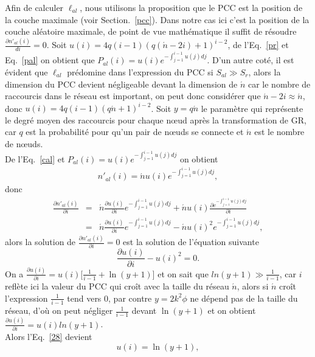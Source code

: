 Afin de calculer $\ell_{al}$, nous utilisons la proposition que le PCC est la position de la couche maximale (voir Section.~\ref{pcc}). Dans notre cas ici c'est la position de la couche aléatoire maximale, de point de vue mathématique il suffit de résoudre $\frac{\partial n'_{al}(i)}{di}=0$. Soit $u(i)=4q(i-1)(q(\acute{n}-2i)+1)^{i-2}$, de l'Eq.~\eqref{pr} et Eq.~\eqref{pal} on obtient que $P_{al}(i)=u(i)e^{-\int_{j=1}^{i-1}u(j)dj}$. D'un autre coté, il est évident que $\ell_{al}$ prédomine dans l'expression du PCC si $S_{al}\gg S_r$, alors la dimension du PCC devient négligeable devant la dimension de $\acute{n}$ car le nombre de raccourcis dans le réseau est important, on peut donc considérer que $\acute{n}-2i\approx \acute{n}$, donc
$u(i)=4q(i-1)(q\acute{n}+1)^{i-2}$. Soit  $y=q\acute{n}$ le paramètre qui représente le degré moyen des raccourcis pour chaque nœud après la transformation de GR, car $q$ est la probabilité pour qu'un pair de nœuds se connecte et $\acute{n}$ est le nombre de nœuds.\\
 De l'Eq.~\eqref{cal} et $P_{al}(i)=u(i)e^{-\int_{j=1}^{i-1}u(j)dj}$  on obtient
\begin{eqnarray}
n'_{al}(i)=\acute{n}u(i)e^{-\int_{j=1}^{i-1}u(j)dj},
\end{eqnarray}
donc 
\begin{eqnarray}
\frac{\partial n'_{al}(i)}{\partial i}&=&\acute{n}\frac{\partial u(i)}{\partial i}e^{-\int_{j=1}^{i-1}u(j)dj}+\acute{n}u(i)\frac{\partial e^{-\int_{j=1}^{i-1}u(j)dj}}{\partial i}\\\nonumber
&=&\acute{n}\frac{\partial u(i)}{\partial i}e^{-\int_{j=1}^{i-1}u(j)dj}-\acute{n}u(i)^2e^{-\int_{j=1}^{i-1}u(j)dj},\nonumber
\end{eqnarray}
alors la solution de $\frac{\partial n'_{al}(i)}{\partial i}=0$ est la solution de l'équation suivante
\begin{equation}
\frac{\partial u(i)}{\partial i}-u(i)^2=0.
\label{28}
\end{equation}
On a $\frac{\partial u(i)}{\partial i}=u(i)\big[\frac{1}{i-1}+\ln(y+1)\big]$ et on sait que $ln(y+1)\gg\frac{1}{i-1}$, car $i$ reflète ici la valeur du PCC qui croît avec la taille 
du réseau $\acute{n}$, alors si $\acute{n}$ croît l'expression $\frac{1}{i-1}$ tend vers $0$, par contre $y=2k^2\phi$ ne dépend pas de la taille du réseau, d'où on peut négliger $\frac{1}{i-1}$ devant
$\ln(y+1)$ et  on obtient $\frac{\partial u(i)}{\partial i}=u(i)ln(y+1)$.\\
Alors l'Eq.~\eqref{28} devient
\begin{equation}
u(i)=\ln(y+1),
\label{29}
\end{equation}
